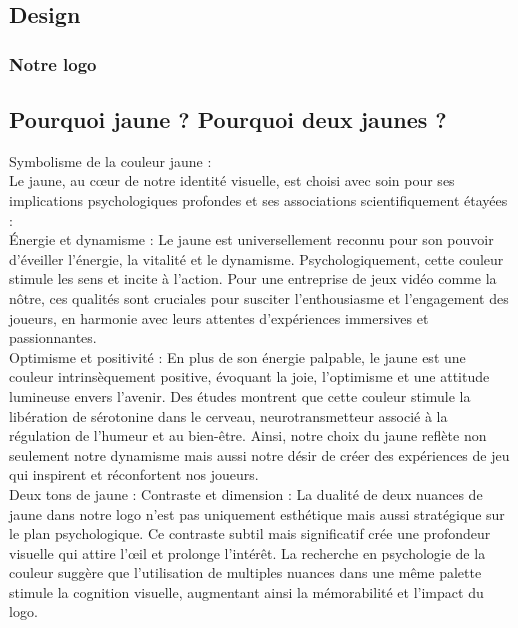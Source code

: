 
\subsection{Design}

\subsubsection{Notre logo}

\subsection*{Pourquoi jaune ? Pourquoi deux jaunes ?}

Symbolisme de la couleur jaune :
\\

Le jaune, au cœur de notre identité visuelle, est choisi avec soin pour ses implications psychologiques profondes et ses associations scientifiquement étayées :
\\

Énergie et dynamisme : Le jaune est universellement reconnu pour son pouvoir d'éveiller l'énergie, la vitalité et le dynamisme. Psychologiquement, cette couleur stimule les sens et incite à l'action. Pour une entreprise de jeux vidéo comme la nôtre, ces qualités sont cruciales pour susciter l'enthousiasme et l'engagement des joueurs, en harmonie avec leurs attentes d'expériences immersives et passionnantes.
\\

Optimisme et positivité : En plus de son énergie palpable, le jaune est une couleur intrinsèquement positive, évoquant la joie, l'optimisme et une attitude lumineuse envers l'avenir. Des études montrent que cette couleur stimule la libération de sérotonine dans le cerveau, neurotransmetteur associé à la régulation de l'humeur et au bien-être. Ainsi, notre choix du jaune reflète non seulement notre dynamisme mais aussi notre désir de créer des expériences de jeu qui inspirent et réconfortent nos joueurs.
\\

Deux tons de jaune :
Contraste et dimension : La dualité de deux nuances de jaune dans notre logo n'est pas uniquement esthétique mais aussi stratégique sur le plan psychologique. Ce contraste subtil mais significatif crée une profondeur visuelle qui attire l'œil et prolonge l'intérêt. La recherche en psychologie de la couleur suggère que l'utilisation de multiples nuances dans une même palette stimule la cognition visuelle, augmentant ainsi la mémorabilité et l'impact du logo.
\\

